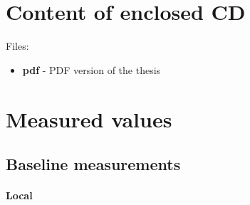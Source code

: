 





\chapter{Content of enclosed CD}
\label{appendix:cd}
Files:
\begin{itemize}
  \item \textbf{pdf} - PDF version of the thesis
\end{itemize}

\chapter{Measured values}
\label{appendix:data}

\section{Baseline measurements}

\subsubsection{Local}

